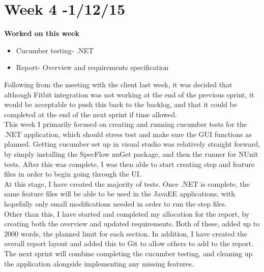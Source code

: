 \section{Week 4 -1/12/15}
\textbf{Worked on this week}
\begin{itemize}
\item Cucumber testing- .NET
\item Report- Overview and requirements specification
\end{itemize}
Following from the meeting with the client last week, it was decided that although Fitbit integration was not working at the end of the previous sprint, it would be acceptable to push this back to the backlog, and that it could be completed at the end of the next sprint if time allowed. \\
This week I primarily focused on creating and running cucumber tests for the .NET application, which should stress test and make sure the GUI functions as planned. Getting cucumber set up in visual studio was relatively straight forward, by simply installing the SpecFlow nuGet package, and then the runner for NUnit tests. After this was complete, I was then able to start creating step and feature files in order to begin going through the UI.\\
At this stage, I have created the majority of tests. Once .NET is complete, the same feature files will be able to be used in the JavaEE applications, with hopefully only small modifications needed in order to run the step files.\\
Other than this, I have started and completed my allocation for the report, by creating both the overview and updated requirements. Both of these, added up to 2000 words, the planned limit for each section. In addition, I have created the overall report layout and added this to Git to allow others to add to the report.\\
The next sprint will combine completing the cucumber testing, and cleaning up the application alongside implementing any missing features.

